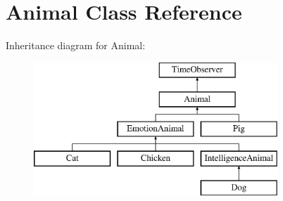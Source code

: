 \hypertarget{class_animal}{}\section{Animal Class Reference}
\label{class_animal}
Inheritance diagram for Animal\+:\begin{figure}[H]
\begin{center}
\leavevmode
\includegraphics[height=5.000000cm]{class_animal}
\end{center}
\end{figure}
